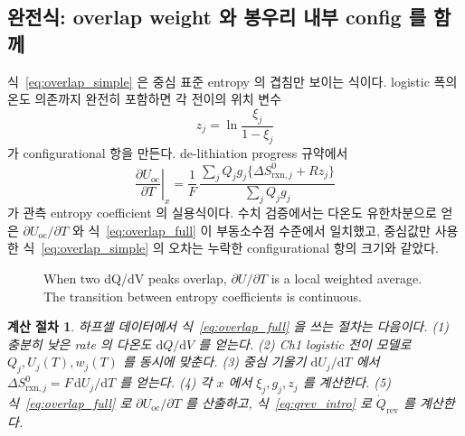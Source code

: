 \documentclass[11pt,a4paper]{article}
\newtheorem*{procedurebox}{계산 절차}
\newcommand{\dd}{\mathrm{d}}
\newcommand{\rxn}{\mathrm{rxn}}
\newcommand{\rev}{\mathrm{rev}}
\newcommand{\oc}{\mathrm{oc}}
\begin{document}
\subsection{완전식: overlap weight 와 봉우리 내부 config 를 함께}
식~\eqref{eq:overlap_simple} 은 중심 표준 entropy 의 겹침만 보이는 식이다. logistic 폭의 온도 의존까지
완전히 포함하면 각 전이의 위치 변수
\begin{equation}
z_j=\ln\frac{\xi_j}{1-\xi_j}
\label{eq:zj}
\end{equation}
가 configurational 항을 만든다. de-lithiation progress 규약에서
\begin{equation}
\boxed{\;
\left.\frac{\partial U_\oc}{\partial T}\right|_x
=\frac{1}{F}\,
\frac{\sum_j Q_jg_j\{\Delta S_{\rxn,j}^0+Rz_j\}}
     {\sum_j Q_jg_j}
\;}
\label{eq:overlap_full}
\end{equation}
가 관측 entropy coefficient 의 실용식이다. 수치 검증에서는 다온도 유한차분으로 얻은
$\partial U_\oc/\partial T$ 와 식~\eqref{eq:overlap_full} 이 부동소수점 수준에서 일치했고, 중심값만
사용한 식~\eqref{eq:overlap_simple} 의 오차는 누락한 configurational 항의 크기와 같았다.

\begin{figure}[t]
\centering
{}
\caption{When two dQ/dV peaks overlap, $\partial U/\partial T$ is a local
weighted average. The transition between entropy coefficients is continuous.}
\label{fig:overlap_weight}
\end{figure}

\begin{procedurebox}
하프셀 데이터에서 식~\eqref{eq:overlap_full} 을 쓰는 절차는 다음이다.
(1) 충분히 낮은 rate 의 다온도 $\dd Q/\dd V$ 를 얻는다.
(2) Ch1 logistic 전이 모델로 $Q_j,U_j(T),w_j(T)$ 를 동시에 맞춘다.
(3) 중심 기울기 $\dd U_j/\dd T$ 에서 $\Delta S_{\rxn,j}^0=F\,\dd U_j/\dd T$ 를 얻는다.
(4) 각 $x$ 에서 $\xi_j,g_j,z_j$ 를 계산한다.
(5) 식~\eqref{eq:overlap_full} 로 $\partial U_\oc/\partial T$ 를 산출하고,
식~\eqref{eq:qrev_intro} 로 $\dot Q_\rev$ 를 계산한다.
\end{procedurebox}
\end{document}
